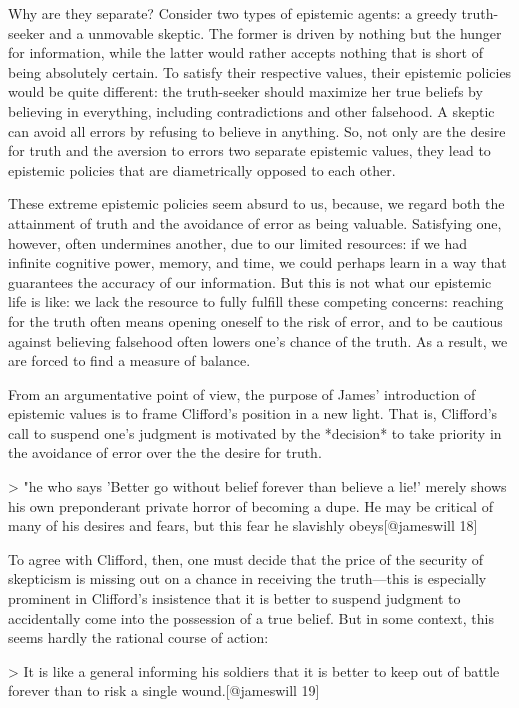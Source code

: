 Why are they separate? Consider two types of epistemic agents: a greedy
truth-seeker and a unmovable skeptic. The former is driven by nothing
but the hunger for information, while the latter would rather accepts
nothing that is short of being absolutely certain. To satisfy their
respective values, their epistemic policies would be quite different:
the truth-seeker should maximize her true beliefs by believing in
everything, including contradictions and other falsehood. A skeptic can
avoid all errors by refusing to believe in anything. So, not only are
the desire for truth and the aversion to errors two separate epistemic
values, they lead to epistemic policies that are diametrically opposed
to each other.

These extreme epistemic policies seem absurd to us, because, we regard
both the attainment of truth and the avoidance of error as being
valuable. Satisfying one, however, often undermines another, due to our
limited resources: if we had infinite cognitive power, memory, and time,
we could perhaps learn in a way that guarantees the accuracy of our
information. But this is not what our epistemic life is like: we lack
the resource to fully fulfill these competing concerns: reaching for the
truth often means opening oneself to the risk of error, and to be
cautious against believing falsehood often lowers one's chance of the
truth. As a result, we are forced to find a measure of balance.

From an argumentative point of view, the purpose of James' introduction
of epistemic values is to frame Clifford's position in a new light. That
is, Clifford's call to suspend one's judgment is motivated by the
*decision* to take priority in the avoidance of error over the the
desire for truth.

\textgreater{} "he who says 'Better go without belief forever than
believe a lie!' merely shows his own preponderant private horror of
becoming a dupe. He may be critical of many of his desires and fears,
but this fear he slavishly obeys{[}@jameswill 18{]}

To agree with Clifford, then, one must decide that the price of the
security of skepticism is missing out on a chance in receiving the
truth---this is especially prominent in Clifford's insistence that it is
better to suspend judgment to accidentally come into the possession of a
true belief. But in some context, this seems hardly the rational course
of action:

\textgreater{} It is like a general informing his soldiers that it is
better to keep out of battle forever than to risk a single
wound.{[}@jameswill 19{]}

